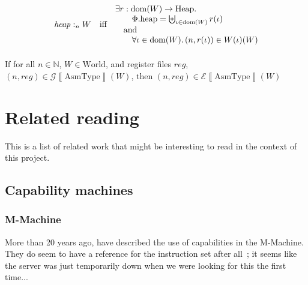\documentclass{article}
\newcommand{\forcenewline}{$\phantom{v}$\\}
\newcommand{\sem}[1]{\left\llbracket #1 \right\rrbracket}
\DeclareMathOperator{\dom}{dom}
\newcommand{\var}[1]{\mathit{#1}}
\newcommand{\reg}{\var{reg}}
\newcommand{\heap}{\var{heap}}
\newcommand{\plainproj}[1]{\mathrm{#1}}
\newcommand{\memheap}[1][\Phi]{#1.\plainproj{heap}}
\newcommand{\heapSat}[3][\heap]{#1 :_{#2} #3}
\newcommand{\asmType}{\plaindom{AsmType}}
\newcommand{\plaindom}[1]{\mathrm{#1}}
\newcommand{\Heaps}{\plaindom{Heap}}
\newcommand{\nats}{\mathbb{N}}
\newcommand{\Worlds}{\plaindom{World}}
\newcommand{\intr}[2]{\mathcal{#1}\sem{#2}}
\newcommand{\exprintr}[1]{\intr{E}{#1}}
\newcommand{\envintr}[1]{\intr{G}{#1}}
\newcommand{\stder}{\exprintr{\asmType}}
\newcommand{\stdgr}{\envintr{\asmType}}
\newcommand{\npair}[2][n]{\left(#1,#2 \right)}
\begin{document}
\begin{definition}
\begin{align*}
  \heapSat{n}{W} & & \text{iff} & &
                                      \arraycolsep=0pt
                                      \begin{array}{l}
                                      \exists r: \dom(W) \rightarrow \Heaps \ldotp \\
                                      \qquad\memheap = \biguplus_{\iota\in \dom(W)} r(\iota)\\
                                      \quad\text{and}\\
                                      \qquad\forall \iota \in \dom(W) \ldotp \npair{r(\iota)} \in W(\iota)(W)
                                      \end{array}\\
\end{align*}


\end{definition}
\begin{lemma} \forcenewline
  If for all $n \in \nats$, $W \in \Worlds$, and register files $\reg$, $\npair{\reg} \in \stdgr(W)$, then $(n,\reg) \in \stder(W)$
\end{lemma}

\section{Related reading}
\label{sec:related-reading}

This is a list of related work that might be interesting to read in the context
of this project.

\subsection{Capability machines}
\label{sec:rw-cap-machines}

\subsubsection{M-Machine}
More than 20 years ago, \cite{Carter:1994:HSF:195473.195579} have described the
use of capabilities in the M-Machine. They do seem to have a reference for the
instruction set after all~\citep{Dally1997Memo59}; it seems like the server was
just temporarily down when we were looking for this the first time...
\end{document}
